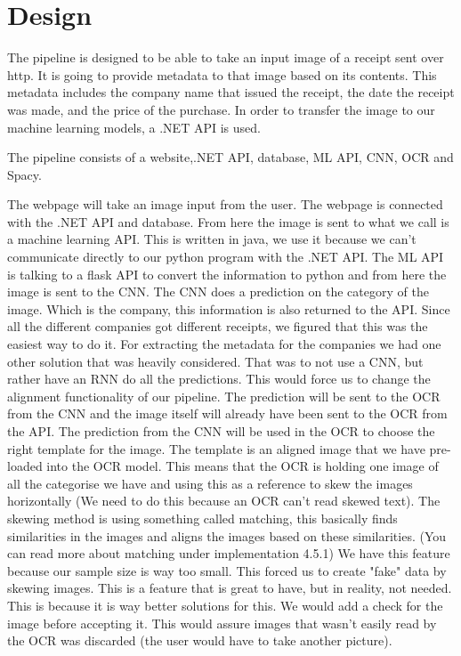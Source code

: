 \chapter{Design}
\label{ch:design}

The pipeline is designed to be able to take an input image of a receipt sent over http.
It is going to provide metadata to that image based on its contents.
This metadata includes the company name that issued the receipt, the date the receipt was made, and the price of the purchase.
In order to transfer the image to our machine learning models, a .NET API is used.

The pipeline consists of a website,.NET API, database, ML API, CNN, OCR and Spacy.

The webpage will take an image input from the user.
The webpage is connected with the .NET API and database.
From here the image is sent to what we call is a machine learning API.
This is written in java, we use it because we can't communicate directly to our python program with the .NET API.
The ML API is talking to a flask API to convert the information to python and from here the image is sent to the CNN.
The CNN does a prediction on the category of the image.
Which is the company, this information is also returned to the API\@.
Since all the different companies got different receipts, we figured that this  was the easiest way to do it.
For extracting the metadata for the companies we had one other solution that was heavily considered.
That was to not use a CNN, but rather have an RNN do all the predictions.
This would force us to change the alignment functionality of our pipeline.
The prediction will be sent to the OCR from the CNN and the image itself will already have been sent to the OCR from the API\@.
The prediction from the CNN will be used in the OCR to choose the right template for the image.
The template is an aligned image that we have pre-loaded into the OCR model.
This means that the OCR is holding one image of all the categorise we have and using this as a reference to skew the images horizontally (We need to do this because an OCR can't read skewed text).
The skewing method is using something called matching, this basically finds similarities in the images and aligns the images based on these similarities. (You can read more about matching under implementation 4.5.1)
We have this feature because our sample size is way too small.
This forced us to create "fake" data by skewing images.
This is a feature that is great to have, but in reality, not needed.
This is because it is way better solutions for this.
We would add a check for the image before accepting it.
This would assure images that wasn't easily read by the OCR was discarded (the user would have to take another picture).

